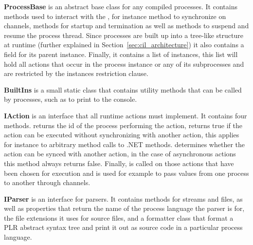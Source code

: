 	\textbf{ProcessBase} is an abstract base class for any compiled processes.
	It contains methods used to interact with the ,
	for instance method to synchronize on channels, methods for startup and
	termination as well as methods to suspend and resume the process thread.
	Since processes are built up into a tree-like structure at runtime (further 
	explained in Section~\ref{sec:cil_architecture}) it also contains a field 
	for its parent  instance. Finally, it contains a list of 
	 instances, this list will hold all actions that occur in 
	the process instance or any of its subprocesses and are restricted by the 
	instances restriction clause.
	
	\textbf{BuiltIns} is a small static class that contains utility methods
	that can be called by processes, such as to print to the console.
	
	\textbf{IAction} is an interface that all runtime actions must implement.
	It contains four methods.  returns the id of the
	process performing the action,  returns true if
	the action can be executed without synchronizing with another action, 
	this applies for instance to arbitrary method calls to .NET methods.
	 determines whether the action can be 
	synced with another action, in the case of asynchronous actions this
	method always returns false. Finally,  is 
	called on those actions that have been chosen for execution and is used
	for example to pass values from one process to another through channels.

	\textbf{IParser} is an interface for parsers. It contains 
	methods for streams and files, as well as properties that return the
	name of the process language the parser is for, the file extensions it
	uses for source files, and a formatter class that format a PLR abstract
	syntax tree and print it out as source code in a particular process language.
	
